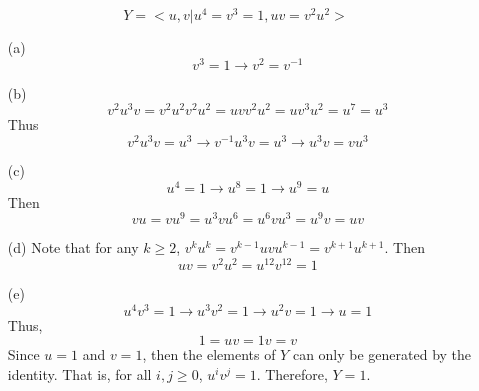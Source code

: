 \documentclass[12pt]{article}
\begin{document}
\begin{itemize}
$$Y = <u, v | u^4 = v^3 = 1, uv = v^2u^2>$$
\begin{itemize}
\item[(a)]
$$v^3 = 1 \rightarrow v^2 = v^{-1}$$
\item[(b)]
$$v^2u^3v = v^2u^2v^2u^2 = uvv^2u^2 = uv^3u^2 = u^7 = u^3$$
Thus
$$v^2u^3v = u^3 \rightarrow v^{-1}u^3v = u^3 \rightarrow u^3v = vu^3$$
\item[(c)]
$$u^4 = 1 \rightarrow u^8 = 1 \rightarrow u^9 = u$$
Then
$$vu = vu^9 = u^3vu^6 = u^6vu^3 = u^9v = uv$$
\item[(d)]
Note that for any $k \geq 2$, $v^ku^k = v^{k-1}uvu^{k-1} = v^{k+1}u^{k+1}$. Then
$$uv = v^2u^2 = u^{12}v^{12} = 1$$
\item[(e)]
$$u^4v^3 = 1 \rightarrow u^3v^2 = 1 \rightarrow u^2v = 1 \rightarrow u = 1$$
Thus,
$$1 = uv = 1v = v$$
Since $u = 1$ and $v = 1$, then the elements of $Y$ can only be generated by the identity. That is, for all $i, j \geq 0$, $u^iv^j = 1$. Therefore, $Y = 1$.
\end{itemize}
\end{itemize}
\end{document}

